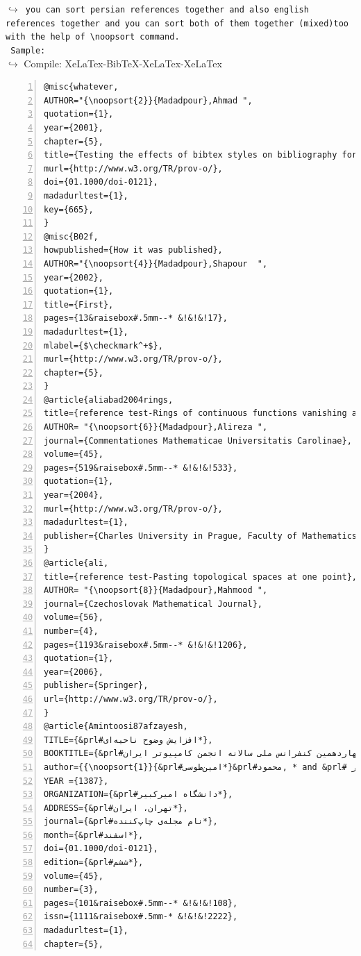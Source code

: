 \documentclass{article}
\begin{document}
\begin{latin}
{\tt {\color{red}$\hookrightarrow$ you can sort  persian references together and also 
english \linebreak references together and  you can sort  both of them together (mixed)\linebreak too with the help of 
\verb|\noopsort| command.}}\\
{\tt\color{blue} Sample:}\\
{\color{blue}$\hookrightarrow$ Compile: XeLaTex-BibTeX-XeLaTex-XeLaTex}
\end{latin}
\begin{Verbatim}[numbers=left,fontsize=\bf,commandchars=\&\#\*,baselinestretch=1,firstnumber=1,formatcom=\color{green!50!black}]
@misc{whatever,
AUTHOR="{\noopsort{2}}{Madadpour},Ahmad ",
quotation={1},
year={2001},
chapter={5},
title={Testing the effects of bibtex styles on bibliography formatting},
murl={http://www.w3.org/TR/prov-o/},
doi={01.1000/doi-0121},
madadurltest={1},
key={665},
}
@misc{B02f,
howpublished={How it was published},
AUTHOR="{\noopsort{4}}{Madadpour},Shapour  ",
year={2002},
quotation={1},
title={First},
pages={13&raisebox#.5mm--* &!&!&!17},
madadurltest={1},
mlabel={$\checkmark^+$},
murl={http://www.w3.org/TR/prov-o/},
chapter={5},
}
@article{aliabad2004rings,
title={reference test-Rings of continuous functions vanishing at infinity},
AUTHOR= "{\noopsort{6}}{Madadpour},Alireza ",
journal={Commentationes Mathematicae Universitatis Carolinae},
volume={45},
pages={519&raisebox#.5mm--* &!&!&!533},
quotation={1},
year={2004},
murl={http://www.w3.org/TR/prov-o/},
madadurltest={1},
publisher={Charles University in Prague, Faculty of Mathematics and Physics},
}
@article{ali,
title={reference test-Pasting topological spaces at one point},
AUTHOR= "{\noopsort{8}}{Madadpour},Mahmood ",
journal={Czechoslovak Mathematical Journal},
volume={56},
number={4},
pages={1193&raisebox#.5mm--* &!&!&!1206},
quotation={1},
year={2006},
publisher={Springer},
url={http://www.w3.org/TR/prov-o/},
}
@article{Amintoosi87afzayesh,
TITLE={&prl#افزایش وضوح ناحیه‌ای*},
BOOKTITLE={&prl#چهاردهمین کنفرانس ملی سالانه انجمن کامپیوتر ایران*},
author={{\noopsort{1}}{&prl#امین‌طوسی*}&prl#محمود, * and &prl# مزینی ,ناصر*and &prl#سایرین*},
YEAR ={1387},
ORGANIZATION={&prl#دانشگاه امیرکبیر*},
ADDRESS={&prl#تهران، ایران*},
journal={&prl#نام مجله‌ی چاپ‌کننده*},
month={&prl#اسفند*},
doi={01.1000/doi-0121},
edition={&prl#ششم*},
volume={45},
number={3},
pages={101&raisebox#.5mm--* &!&!&!108},
issn={1111&raisebox#.5mm-* &!&!&!2222},
madadurltest={1},
chapter={5},

\end{Verbatim}
\end{document}
